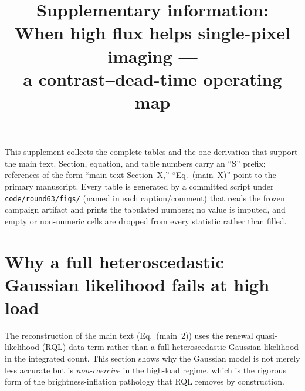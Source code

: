 \documentclass[10pt]{article}
\title{Supplementary information:\\
When high flux helps single-pixel imaging ---\\
a contrast--dead-time operating map}
\author{}
\date{}
\begin{document}
\maketitle

\noindent
This supplement collects the complete tables and the one derivation that support
the main text. Section, equation, and table numbers carry an ``S'' prefix;
references of the form ``main-text Section~X,'' ``Eq.~(main~X)'' point to the
primary manuscript. Every table is generated by a committed script under
\texttt{code/round63/figs/} (named in each caption/comment) that reads the frozen
campaign artifact and prints the tabulated numbers; no value is imputed, and
empty or non-numeric cells are dropped from every statistic rather than filled.

\section{Why a full heteroscedastic Gaussian likelihood fails at high load}
\label{sec:s1}

The reconstruction of the main text (Eq.~(main~2)) uses the renewal
quasi-likelihood (RQL) data term rather than a full heteroscedastic Gaussian
likelihood in the integrated count. This section shows why the Gaussian model is
not merely less accurate but is \emph{non-coercive} in the high-load regime,
which is the rigorous form of the brightness-inflation pathology that RQL removes
by construction.
\end{document}
